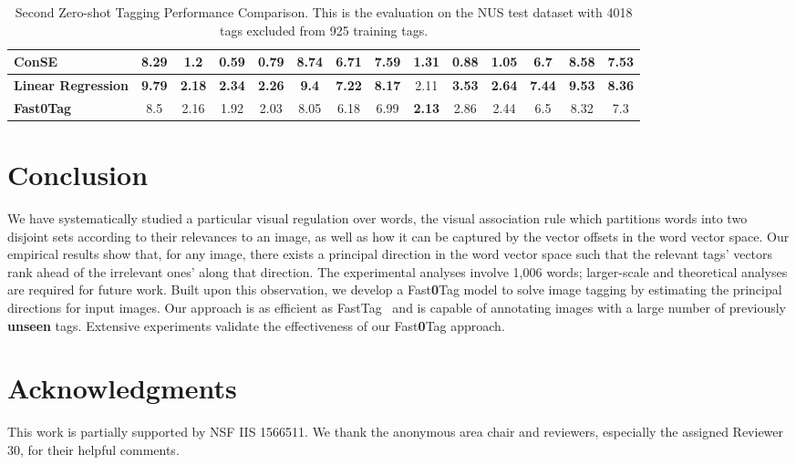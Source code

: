 \documentclass[10pt,twocolumn,letterpaper]{article}
\newcommand{\ours}{{Fast\textbf{0}Tag}}
\begin{document}
{\begin{table*}
\begin{center}
\begin{tabular}{|l||c|c|c|c|c|c|c|c|c|c|c|c|c|}
    
\hline\hline
{\bf ConSE}~\cite{norouzi_zero-shot_2013} & 8.29 & 1.2 & 0.59 & 0.79 & 8.74 & 6.71 & 7.59 & 1.31 & 0.88 & 1.05 & 6.7 & 8.58 & 7.53\\
\hline
{\bf Linear Regression} & {\bf 9.79} & {\bf 2.18} & {\bf 2.34} & {\bf 2.26} & {\bf 9.4} & {\bf 7.22} & {\bf 8.17} & 2.11 & {\bf 3.53} & {\bf 2.64} & {\bf 7.44} & {\bf 9.53} & {\bf 8.36}\\
\hline
{\bf Fast0Tag} & 8.5 & 2.16 & 1.92 & 2.03 & 8.05 & 6.18 & 6.99 & {\bf 2.13} & 2.86 & 2.44 & 6.5 & 8.32 & 7.3\\

\hline
\end{tabular}
\end{center}
\caption{Second Zero-shot Tagging Performance Comparison. This is the evaluation on the NUS test dataset with 4018 tags excluded from 925 training tags.}
\label{tbl:mixed_result}
\end{table*}
}













 \section{Conclusion}
\label{sConclusion}

We have systematically studied a particular visual regulation over words, the visual association rule which partitions words into two disjoint sets according to their relevances to an image, as well as how it can be captured by the  vector offsets in the word vector space. Our empirical results show that, for any image, there exists a principal direction in the word vector space such that the relevant tags\rq{}  vectors rank ahead of the irrelevant ones\rq{} along that direction. The experimental analyses involve 1,006 words;  larger-scale and theoretical analyses are required for future work. Built upon this observation, we develop a {\ours} model to solve image tagging by estimating the principal directions for input images. Our approach is as efficient as FastTag~\cite{chen_fast_2013} and is capable of annotating images with a large number of previously {\bf unseen} tags. Extensive experiments validate the effectiveness of our {\ours} approach.
 
\section*{Acknowledgments} This work is partially supported by NSF IIS 1566511. We thank the anonymous area chair and reviewers, especially the assigned Reviewer 30, for their helpful comments. 
\end{document}
